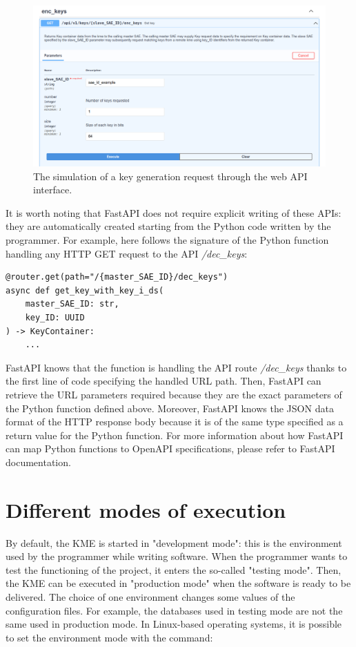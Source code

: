 \begin{figure}[H]
    \centering
    \includegraphics[width=1.0\textwidth]{Images/openapi_enc_keys.png}
    \caption{The simulation of a key generation request through the web API interface.}
    \label{fig:openapi_enc_keys}
\end{figure}

It is worth noting that FastAPI does not require explicit writing of these APIs: they are automatically created starting from the Python code written by the programmer. For example, here follows the signature of the Python function handling any HTTP GET request to the API \textit{/dec\_keys}:

\begin{verbatim}
@router.get(path="/{master_SAE_ID}/dec_keys")
async def get_key_with_key_i_ds(
    master_SAE_ID: str,
    key_ID: UUID
) -> KeyContainer:
    ...
\end{verbatim}

FastAPI knows that the function is handling the API route \textit{/dec\_keys} thanks to the first line of code specifying the handled URL path. Then, FastAPI can retrieve the URL parameters required because they are the exact parameters of the Python function defined above. Moreover, FastAPI knows the JSON data format of the HTTP response body because it is of the same type specified as a return value for the Python function. For more information about how FastAPI can map Python functions to OpenAPI specifications, please refer to FastAPI documentation.

\section{Different modes of execution}
By default, the KME is started in "development mode": this is the environment used by the programmer while writing software. When the programmer wants to test the functioning of the project, it enters the so-called "testing mode". Then, the KME can be executed in "production mode" when the software is ready to be delivered. The choice of one environment changes some values of the configuration files. For example, the databases used in testing mode are not the same used in production mode. In Linux-based operating systems, it is possible to set the environment mode with the command:

